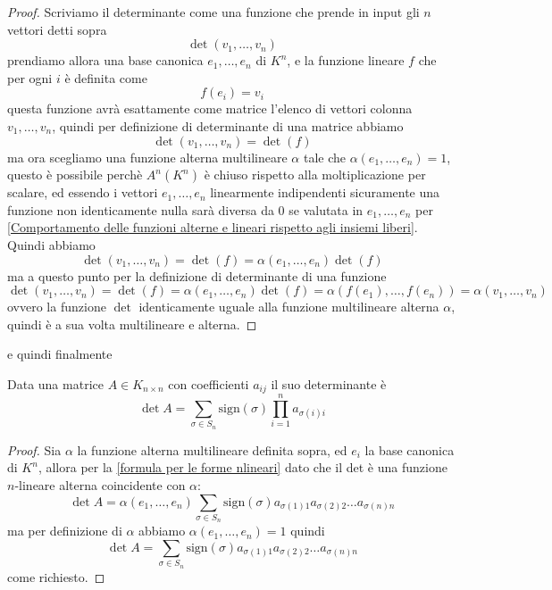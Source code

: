 \documentclass[11pt]{scrartcl}
\begin{document}
   	 \begin{proof}
   	 	Scriviamo il determinante come una funzione che prende in input gli $n$ vettori detti sopra
   	 	$$\det(v_1,\dots,v_n)$$
   	 	prendiamo allora una base canonica $e_1,\dots,e_n$ di $K^n$, e la funzione lineare $f$ che per ogni $i$ è definita come
   	 	$$f(e_i)=v_i$$
   	 	questa funzione avrà esattamente come matrice l'elenco di vettori colonna $v_1,\dots,v_n$, quindi per definizione di determinante di una matrice abbiamo
   	 	$$\det(v_1,\dots,v_n)=\det(f)$$
   	 	ma ora scegliamo una funzione alterna multilineare $\alpha$ tale che $\alpha(e_1,\dots,e_n)=1$, questo è possibile perchè $A^n(K^n)$ è chiuso rispetto alla moltiplicazione per scalare, ed essendo i vettori $e_1,\dots,e_n$ linearmente indipendenti sicuramente una funzione non identicamente nulla sarà diversa da $0$ se valutata in $e_1,\dots,e_n$ per \ref{Comportamento delle funzioni alterne e lineari rispetto agli insiemi liberi}. Quindi abbiamo
   	 	$$\det(v_1,\dots,v_n)=\det(f)=\alpha(e_1,\dots,e_n)\det(f)$$
   	 	ma a questo punto per la definizione di determinante di una funzione
   	 	$$\det(v_1,\dots,v_n)=\det(f)=\alpha(e_1,\dots,e_n)\det(f)=\alpha\left(f(e_1),\dots,f(e_n)\right)=\alpha(v_1,\dots,v_n)$$
   	 	ovvero la funzione $\det$ identicamente uguale alla funzione multilineare alterna $\alpha$, quindi è a sua volta multilineare e alterna.
   	 \end{proof}
   	 e quindi finalmente
   	 \begin{corollary}\label{formula esplicita per il determinante di una matrice}
   	 	Data una matrice $A\in K_{n\times n}$ con coefficienti $a_{ij}$ il suo determinante è
   	 	$$\det A=\sum_{\sigma\in S_n}\text{sign}(\sigma)\prod_{i=1}^n a_{\sigma(i)i}$$
   	 \end{corollary}
   	 \begin{proof}
   	 	Sia $\alpha$ la funzione alterna multilineare definita sopra, ed $e_i$ la base canonica di $K^n$, allora per la \ref{formula per le forme nlineari} dato che il det è una funzione $n$-lineare alterna coincidente con $\alpha$:
   	 	$$\det A = \alpha(e_1,\dots,e_n)\sum_{\sigma\in S_n}\text{sign}(\sigma)a_{\sigma(1)1}a_{\sigma(2)2}\dots a_{\sigma(n)n}$$
   	 	ma per definizione di $\alpha$ abbiamo $\alpha(e_1,\dots,e_n)=1$ quindi
   	 	$$\det A = \sum_{\sigma\in S_n}\text{sign}(\sigma)a_{\sigma(1)1}a_{\sigma(2)2}\dots a_{\sigma(n)n}$$
   	 	come richiesto.
   	 \end{proof}
\end{document}
